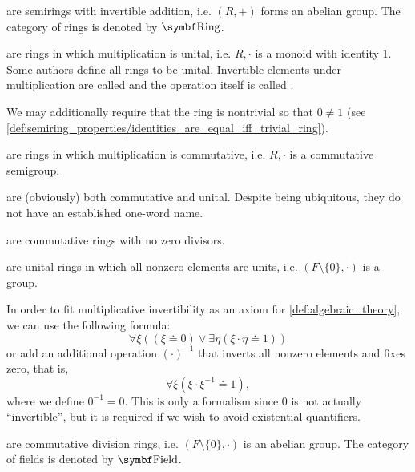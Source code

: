\begin{definition}
\begin{defenum}
      are semirings with invertible addition, i.e. \( (R, +) \) forms an abelian group. The category of rings is denoted by \( \Cat{Ring} \).

      are rings in which multiplication is unital, i.e. \( R, \cdot \) is a monoid with identity \( 1 \). Some authors define all rings to be unital. Invertible elements under multiplication are called  and the operation itself is called .

    We may additionally require that the ring is nontrivial so that \( 0 \neq 1 \) (see \cref{def:semiring_properties/identities_are_equal_iff_trivial_ring}).

      are rings in which multiplication is commutative, i.e. \( R, \cdot \) is a commutative semigroup.

      are (obviously) both commutative and unital. Despite being ubiquitous, they do not have an established one-word name.

      are commutative rings with no zero divisors.

      are unital rings in which all nonzero elements are units, i.e. \( (F \setminus \{ 0 \}, \cdot) \) is a group.

    In order to fit multiplicative invertibility as an axiom for \cref{def:algebraic_theory}, we can use the following formula:
    \begin{equation*}
      \forall \xi ((\xi \doteq 0) \lor \exists \eta (\xi \cdot \eta \doteq 1))
    \end{equation*}
    or add an additional operation \( (\cdot)^{-1} \) that inverts all nonzero elements and fixes zero, that is,
    \begin{equation*}
      \forall \xi (\xi \cdot \xi^{-1} \doteq 1),
    \end{equation*}
    where we define \( 0^{-1} = 0 \). This is only a formalism since \( 0 \) is not actually \enquote{invertible}, but it is required if we wish to avoid existential quantifiers.

      are commutative division rings, i.e. \( (F \setminus \{ 0 \}, \cdot) \) is an abelian group. The category of fields is denoted by \( \Cat{Field} \).
  \end{defenum}
\end{definition}

